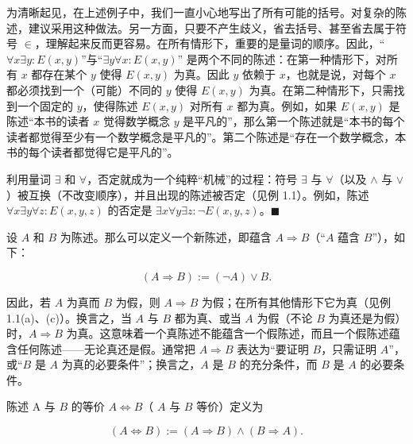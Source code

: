 \begin{remark}

\begin{items}
\item

为清晰起见，在上述例子中，我们一直小心地写出了所有可能的括号。对复杂的陈述，建议采用这种做法。另一方面，只要不产生歧义，省去括号、甚至省去属于符号 $ \in $，理解起来反而更容易。在所有情形下，重要的是量词的顺序。因此，“$ \forall x \exists y : E(x,y) $”与“$ \exists y \forall x : E(x,y) $” 是两个不同的陈述：在第一种情形下，对所有 $ x $ 都存在某个 $ y $ 使得 $ E(x,y) $ 为真。因此 $ y $ 依赖于 $ x $，也就是说，对每个 $ x $ 都必须找到一个（可能）不同的 $ y $ 使得 $ E(x,y) $ 为真。在第二种情形下，只需找到一个固定的 $ y $，使得陈述 $ E(x,y) $ 对所有 $ x $ 都为真。例如，如果 $ E(x,y) $ 是陈述“本书的读者 $ x $ 觉得数学概念 $ y $ 是平凡的”，那么第一个陈述就是“本书的每个读者都觉得至少有一个数学概念是平凡的”。第二个陈述是“存在一个数学概念，本书的每个读者都觉得它是平凡的”。

\item

利用量词 $ \exists $ 和 $ \forall $，否定就成为一个纯粹“机械”的过程：符号 $ \exists $ 与 $ \forall $（以及 $ \land $ 与 $ \lor $）被互换（不改变顺序），并且出现的陈述被否定（见例 1.1）。例如，陈述 $ \forall x \exists y \forall z: E(x,y,z) $ 的否定是 $ \exists x \forall y \exists z: \neg E(x,y,z) $。$ \blacksquare $

\end{items}

设 $A$ 和 $B$ 为陈述。那么可以定义一个新陈述，即蕴含 $A \Rightarrow B$（“$A$ 蕴含 $B$”），如下：

\begin{equation}
(A\Rightarrow B):=(\neg A)\lor B.
\end{equation}

因此，若 $A$ 为真而 $B$ 为假，则 $A \Rightarrow B$ 为假；在所有其他情形下它为真（见例 1.1(a)、(c)）。换言之，当 $A$ 与 $B$ 都为真、或当 $A$ 为假（不论 $B$ 为真还是为假）时，$A \Rightarrow B$ 为真。这意味着一个真陈述不能蕴含一个假陈述，而且一个假陈述蕴含任何陈述——无论真还是假。通常把 $ A \Rightarrow B $ 表达为“要证明 $ B $，只需证明 $ A $”，或“$ B $ 是 $ A $ 为真的必要条件”；换言之，$ A $ 是 $ B $ 的充分条件，而 $ B $ 是 $ A $ 的必要条件。

陈述 A 与 $ B $ 的等价 $ A \Leftrightarrow B $（ $ A $ 与 $ B $ 等价）定义为

\[
(A\Leftrightarrow B):=(A\Rightarrow B)\land(B\Rightarrow A).
\]


\end{remark}
